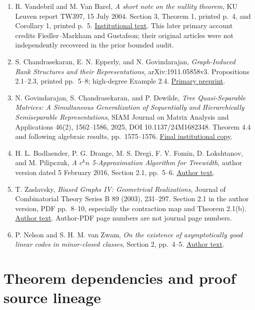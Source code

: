 \documentclass[
  11pt,
]{article}
\providecommand{\tightlist}{%
  \setlength{\itemsep}{0pt}\setlength{\parskip}{0pt}}
\begin{document}
\begin{enumerate}
\def\labelenumi{\arabic{enumi}.}
\tightlist
\item
  R. Vandebril and M. Van Barel, \emph{A short note on the nullity
  theorem}, KU Leuven report TW397, 15 July 2004. Section 3, Theorem 1,
  printed p.~4, and Corollary 1, printed p.~5.
  \href{https://www.cs.kuleuven.be/publicaties/rapporten/tw/TW397.pdf}{Institutional
  text}. This later primary account credits Fiedler--Markham and
  Gustafson; their original articles were not independently recovered in
  the prior bounded audit.
\item
  S. Chandrasekaran, E. N. Epperly, and N. Govindarajan,
  \emph{Graph-Induced Rank Structures and their Representations},
  arXiv:1911.05858v3. Propositions 2.1--2.3, printed pp.~5--8;
  high-degree Example 2.4.
  \href{https://arxiv.org/pdf/1911.05858v3}{Primary preprint}.
\item
  N. Govindarajan, S. Chandrasekaran, and P. Dewilde, \emph{Tree
  Quasi-Separable Matrices: A Simultaneous Generalization of
  Sequentially and Hierarchically Semiseparable Representations}, SIAM
  Journal on Matrix Analysis and Applications 46(2), 1562--1586, 2025,
  DOI 10.1137/24M1682348. Theorem 4.4 and following algebraic results,
  pp.~1575--1576.
  \href{https://repository.tudelft.nl/file/File_6b7549c8-222e-4316-8ac4-a113d7d4da1e}{Final
  institutional copy}.
\item
  H. L. Bodlaender, P. G. Drange, M. S. Dregi, F. V. Fomin, D.
  Lokshtanov, and M. Pilipczuk, \emph{A \(c^k n\) 5-Approximation
  Algorithm for Treewidth}, author version dated 5 February 2016,
  Section 2.1, pp.~5--6.
  \href{https://sites.cs.ucsb.edu/~daniello/papers/treewidthApproxJ.pdf}{Author
  text}.
\item
  T. Zaslavsky, \emph{Biased Graphs IV: Geometrical Realizations},
  Journal of Combinatorial Theory Series B 89 (2003), 231--297. Section
  2.1 in the author version, PDF pp.~8--10, especially the contraction
  map and Theorem 2.1(b).
  \href{https://people.math.binghamton.edu/zaslav/Tpapers/bg4.pdf}{Author
  text}. Author-PDF page numbers are not journal page numbers.
\item
  P. Nelson and S. H. M. van Zwam, \emph{On the existence of
  asymptotically good linear codes in minor-closed classes}, Section 2,
  pp.~4--5.
  \href{https://www.math.uwaterloo.ca/~apnelson/asympgood.pdf}{Author
  text}.
\end{enumerate}

\section{Theorem dependencies and proof source
lineage}\label{theorem-dependencies-and-proof-source-lineage}
\end{document}
